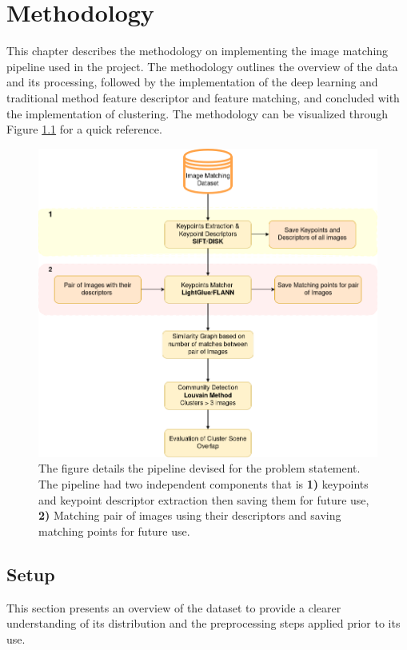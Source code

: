 \documentclass[report.tex]{subfiles}
\begin{document}
\chapter{Methodology}


    This chapter describes the methodology on implementing the image matching pipeline used in the project. The methodology outlines the overview of the data and its processing, followed by the implementation of the deep learning and traditional method feature descriptor and feature matching, and concluded with the implementation of clustering. The methodology can be visualized through Figure \ref{fig:methodology} for a quick reference.

    \begin{figure}[!htbp]
        \centering
        \includegraphics[height=0.65\textwidth]{images/methodology.drawio.png}
        \caption{The figure details the pipeline devised for the problem statement. The pipeline had two independent components that is \textbf{1)} keypoints and keypoint descriptor extraction then saving them for future use, \textbf{2)} Matching pair of images using their descriptors and saving matching points for future use. }
        \label{fig:methodology}
    \end{figure}

    \section{Setup}
    This section presents an overview of the dataset to provide a clearer understanding of its distribution and the preprocessing steps applied prior to its use.
    
\end{document}
